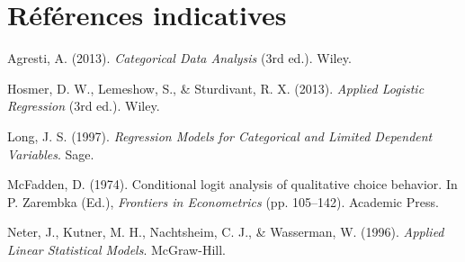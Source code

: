 \documentclass[12pt,a4paper]{article}
\begin{document}
\section*{Références indicatives}

\begin{enumerate}[label={[\arabic*]}]
    \item Agresti, A. (2013). \textit{Categorical Data Analysis} (3rd ed.). Wiley.
    \item Hosmer, D. W., Lemeshow, S., \& Sturdivant, R. X. (2013). \textit{Applied Logistic Regression} (3rd ed.). Wiley.
    \item Long, J. S. (1997). \textit{Regression Models for Categorical and Limited Dependent Variables}. Sage.
    \item McFadden, D. (1974). Conditional logit analysis of qualitative choice behavior. In P. Zarembka (Ed.), \textit{Frontiers in Econometrics} (pp. 105--142). Academic Press.
    \item Neter, J., Kutner, M. H., Nachtsheim, C. J., \& Wasserman, W. (1996). \textit{Applied Linear Statistical Models}. McGraw-Hill.
\end{enumerate}
\end{document}
